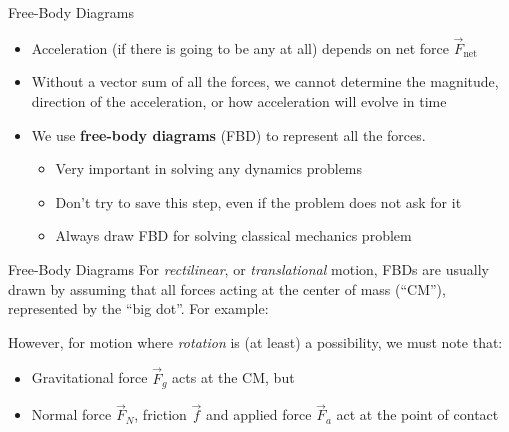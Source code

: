 \documentclass[12pt,compress,aspectratio=169]{beamer}
\begin{document}
\begin{frame}{Free-Body Diagrams}
  \begin{itemize}
  \item Acceleration (if there is going to be any at all) depends
    on net force $\vec F_\text{net}$
  \item Without a vector sum of all the forces, we cannot determine the
    magnitude, direction of the acceleration, or how acceleration will evolve
    in time
  \item We use \textbf{free-body diagrams} (FBD) to represent all the forces.
    \begin{itemize}
    \item Very important in solving any dynamics problems
    \item Don't try to save this step, even if the problem does not ask for it
    \item Always draw FBD for solving classical mechanics problem
    \end{itemize}
  \end{itemize}
\end{frame}



\begin{frame}{Free-Body Diagrams}
  For \emph{rectilinear}, or \emph{translational} motion, FBDs are usually drawn
  by assuming that all forces acting at the center of mass (``CM''),
  represented by the ``big dot''. For example:
  \begin{center}
  \end{center}
  However, for motion where \emph{rotation} is (at least) a possibility, we
  must note that:
  \begin{itemize}
  \item Gravitational force $\vec F_g$ acts at the CM, but
  \item Normal force $\vec F_N$, friction $\vec f$ and applied force $\vec F_a$
    act at the point of contact
  \end{itemize}
\end{frame}
\end{document}
